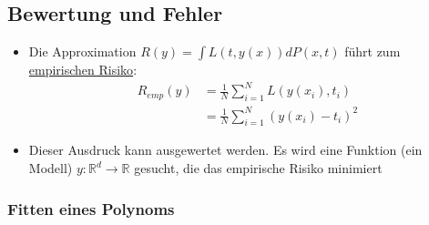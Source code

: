 \documentclass{scrartcl}
\begin{document}
\subsection{Bewertung und Fehler}

\begin{itemize}
	\item Die Approximation $ R(y) = \int L(t, y(x)) dP(x,t) $ führt zum 
	\underline{empirischen Risiko}:
	\begin{align*}
		R_{emp}(y) &= \frac{1}{N} \sum_{i=1}^{N} L(y(x_i), t_i) \\
		&= \frac{1}{N} \sum_{i=1}^{N} (y(x_i) - t_i)^2
	\end{align*}
	\item Dieser Ausdruck kann ausgewertet werden. Es wird eine Funktion (ein 
	Modell) $ y: \mathbb{R}^d \rightarrow \mathbb{R} $ gesucht, die das 
	empirische Risiko minimiert
\end{itemize}

\subsubsection{Fitten eines Polynoms}
\end{document}
